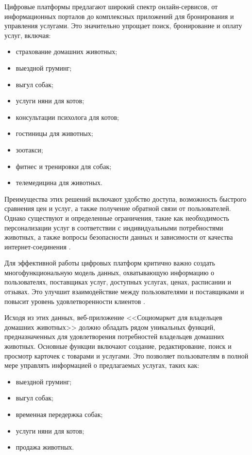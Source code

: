 Цифровые платформы предлагают широкий спектр онлайн-сервисов, от информационных порталов до комплексных приложений для бронирования и управления услугами. Это значительно упрощает поиск, бронирование и оплату услуг, включая:

\begin{itemize}
  \item страхование домашних животных;
  \item выездной груминг;
  \item выгул собак;
  \item услуги няни для котов;
  \item консультации психолога для котов;
  \item гостиницы для животных;
  \item зоотакси;
  \item фитнес и тренировки для собак;
  \item телемедицина для животных.
\end{itemize}

Преимущества этих решений включают удобство доступа, возможность быстрого сравнения цен и услуг, а также получение обратной связи от пользователей. Однако существуют и определенные ограничения, такие как необходимость персонализации услуг в соответствии с индивидуальными потребностями животных, а также вопросы безопасности данных и зависимости от качества интернет-соединения \cite{market}.

Для эффективной работы цифровых платформ критично важно создать многофункциональную модель данных, охватывающую информацию о пользователях, поставщиках услуг, доступных услугах, ценах, расписании и отзывах. Это улучшит взаимодействие между пользователями и поставщиками и повысит уровень удовлетворенности клиентов \cite{freedman}.

Исходя из этих данных, веб-приложение <<Социомаркет для владельцев домашних животных>> должно обладать рядом уникальных функций, предназначенных для удовлетворения потребностей владельцев домашних животных. Основные функции включают создание, редактирование, поиск и просмотр карточек с товарами и услугами. Это позволяет пользователям в полной мере управлять информацией о предлагаемых услугах, таких как:

\begin{itemize}
  \item выездной груминг;
  \item выгул собак;
  \item временная передержка собак;
  \item услуги няни для котов;
  \item продажа животных.
\end{itemize}

